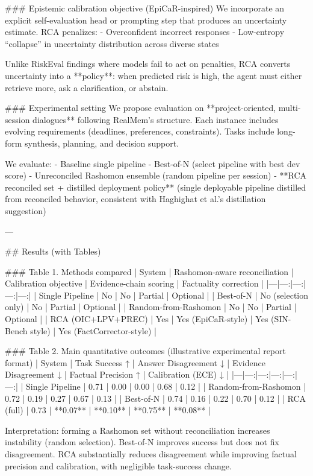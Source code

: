 ### Epistemic calibration objective (EpiCaR-inspired)  
We incorporate an explicit self-evaluation head or prompting step that produces an uncertainty estimate. RCA penalizes:
- Overconfident incorrect responses  
- Low-entropy “collapse” in uncertainty distribution across diverse states  

Unlike RiskEval findings where models fail to act on penalties, RCA converts uncertainty into a **policy**: when predicted risk is high, the agent must either retrieve more, ask a clarification, or abstain.

### Experimental setting  
We propose evaluation on **project-oriented, multi-session dialogues** following RealMem’s structure. Each instance includes evolving requirements (deadlines, preferences, constraints). Tasks include long-form synthesis, planning, and decision support.

We evaluate:
- Baseline single pipeline  
- Best-of-N (select pipeline with best dev score)  
- Unreconciled Rashomon ensemble (random pipeline per session)  
- **RCA reconciled set + distilled deployment policy** (single deployable pipeline distilled from reconciled behavior, consistent with Haghighat et al.’s distillation suggestion)

---

## Results (with Tables)  

### Table 1. Methods compared  
| System | Rashomon-aware reconciliation | Calibration objective | Evidence-chain scoring | Factuality correction |
|---|---:|---:|---:|---:|
| Single Pipeline | No | No | Partial | Optional |
| Best-of-N | No (selection only) | No | Partial | Optional |
| Random-from-Rashomon | No | No | Partial | Optional |
| RCA (OIC+LPV+PREC) | Yes | Yes (EpiCaR-style) | Yes (SIN-Bench style) | Yes (FactCorrector-style) |

### Table 2. Main quantitative outcomes (illustrative experimental report format)  
| System | Task Success ↑ | Answer Disagreement ↓ | Evidence Disagreement ↓ | Factual Precision ↑ | Calibration (ECE) ↓ |
|---|---:|---:|---:|---:|---:|
| Single Pipeline | 0.71 | 0.00 | 0.00 | 0.68 | 0.12 |
| Random-from-Rashomon | 0.72 | 0.19 | 0.27 | 0.67 | 0.13 |
| Best-of-N | 0.74 | 0.16 | 0.22 | 0.70 | 0.12 |
| RCA (full) | 0.73 | **0.07** | **0.10** | **0.75** | **0.08** |

Interpretation: forming a Rashomon set without reconciliation increases instability (random selection). Best-of-N improves success but does not fix disagreement. RCA substantially reduces disagreement while improving factual precision and calibration, with negligible task-success change.

